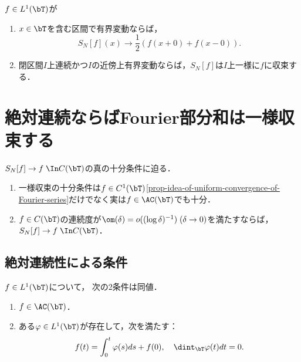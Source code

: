 \documentclass[uplatex,dvipdfmx]{jsreport}
\begin{document}
\begin{theorem}\label{thm-Dirichlet-Jordan-test}
    $f\in L^1(\bT)$が
    \begin{enumerate}
        \item $x\in\bT$を含む区間で有界変動ならば，
        \[S_N[f](x)\to\frac{1}{2}(f(x+0)+f(x-0)).\]
        \item 閉区間$I$上連続かつ$I$の近傍上有界変動ならば，$S_N[f]$は$I$上一様に$f$に収束する．
    \end{enumerate}
\end{theorem}

\section{絶対連続ならばFourier部分和は一様収束する}

\begin{tcolorbox}[colframe=ForestGreen, colback=ForestGreen!10!white,breakable,colbacktitle=ForestGreen!40!white,coltitle=black,fonttitle=\bfseries\sffamily,
title=]
    $S_N[f]\to f\;\In C(\bT)$の真の十分条件に迫る．
    \begin{enumerate}
        \item 一様収束の十分条件は$f\in C^1(\bT)$\ref{prop-idea-of-uniform-convergence-of-Fourier-series}だけでなく実は$f\in\AC(\bT)$でも十分．
        \item $f\in C(\bT)$の連続度が$\om(\delta)=o((\log\delta)^{-1})\;(\delta\to0)$を満たすならば，$S_N[f]\to f\;\In C(\bT)$．
    \end{enumerate}
\end{tcolorbox}

\subsection{絶対連続性による条件}

\begin{lemma}[絶対連続性の特徴付け]
    $f\in L^1(\bT)$について，
    次の2条件は同値．
    \begin{enumerate}
        \item $f\in\AC(\bT)$．
        \item ある$\varphi\in L^1(\bT)$が存在して，次を満たす：
        \[f(t)=\int^t_0\varphi(s)ds+f(0),\quad\dint_\bT\varphi(t)dt=0.\]
    \end{enumerate}
\end{lemma}
\end{document}
